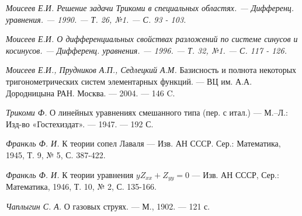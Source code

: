 \documentclass[oneside, final, 14pt]{extreport}
\begin{document}
\begin{thebibliography}{30}
	\it{ Моисеев Е.И.} Решение задачи Трикоми в специальных областях. —
	Дифференц. уравнения. — 1990. — Т. 26, №1. — С. 93 - 103.

	\it{ Моисеев Е.И.} О дифференциальных свойствах разложений по системе синусов и косинусов. —
	Дифференц. уравнения. — 1996. — Т. 32, №1. — С. 117 - 126.
	
	{\it Моисеев Е.И., Прудников А.П., Седлецкий А.М.} Базисность и полнота некоторых тригонометрических систем элементарных функций. —
	ВЦ им. А.А. Дородницына РАН. Москва. — 2004. — 146 C.
	
	{\it Трикоми Ф.} О линейных уравнениях смешанного типа (пер. с итал.) —
	М.–Л.: Изд-во «Гостехиздат». — 1947. — 192 С.
	
	{\it Франкль Ф. И.} К теории сопел Лаваля —
	Изв. АН СССР. Сер.: Математика, 1945, Т. 9, № 5, С. 387-422.
	
	{\it Франкль Ф. И.} К теории уравнения $yZ_{xx} + Z_{yy} = 0$ —
	Изв. АН СССР, Сер.: Математика, 1946, Т. 10, № 2, С. 135-166.
	
	{\it Чаплыгин С. А.}  О газовых струях. — М., 1902. — 121 с.
	
\end{thebibliography}
\end{document}
